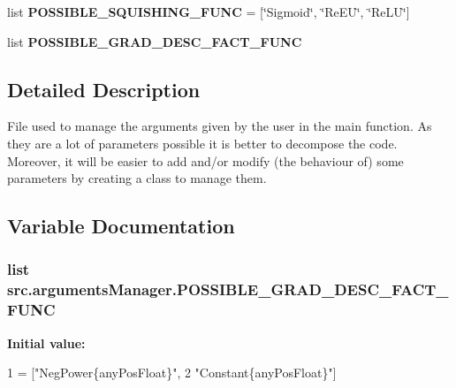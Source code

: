 \begin{DoxyCompactItemize}
\item 
list {\bfseries P\+O\+S\+S\+I\+B\+L\+E\+\_\+\+S\+Q\+U\+I\+S\+H\+I\+N\+G\+\_\+\+F\+U\+NC} = \mbox{[}\char`\"{}Sigmoid\char`\"{}, \char`\"{}Re\+EU\char`\"{}, \char`\"{}Re\+LU\char`\"{}\mbox{]}\hypertarget{namespacesrc_1_1argumentsManager_aa475c3c41fa2a039bb78f0b42cbb001a}{}\label{namespacesrc_1_1argumentsManager_aa475c3c41fa2a039bb78f0b42cbb001a}

\item 
list {\bfseries P\+O\+S\+S\+I\+B\+L\+E\+\_\+\+G\+R\+A\+D\+\_\+\+D\+E\+S\+C\+\_\+\+F\+A\+C\+T\+\_\+\+F\+U\+NC}
\end{DoxyCompactItemize}


\subsection{Detailed Description}
\begin{DoxyVerb}File used to manage the arguments given by the user in the main function.
As they are a lot of parameters possible it is better to decompose the code.
Moreover, it will be easier to add and/or modify (the behaviour of) some
parameters by creating a class to manage them.
\end{DoxyVerb}
 

\subsection{Variable Documentation}
\subsubsection[{\texorpdfstring{P\+O\+S\+S\+I\+B\+L\+E\+\_\+\+G\+R\+A\+D\+\_\+\+D\+E\+S\+C\+\_\+\+F\+A\+C\+T\+\_\+\+F\+U\+NC}{POSSIBLE_GRAD_DESC_FACT_FUNC}}]{\setlength{\rightskip}{0pt plus 5cm}list src.\+arguments\+Manager.\+P\+O\+S\+S\+I\+B\+L\+E\+\_\+\+G\+R\+A\+D\+\_\+\+D\+E\+S\+C\+\_\+\+F\+A\+C\+T\+\_\+\+F\+U\+NC}\hypertarget{namespacesrc_1_1argumentsManager_ae35c445d1916ba9cee50b6ce717b5740}{}\label{namespacesrc_1_1argumentsManager_ae35c445d1916ba9cee50b6ce717b5740}
{\bfseries Initial value\+:}
\begin{DoxyCode}
1 = [\textcolor{stringliteral}{"NegPower\{anyPosFloat\}"},
2     \textcolor{stringliteral}{"Constant\{anyPosFloat\}"}]
\end{DoxyCode}

